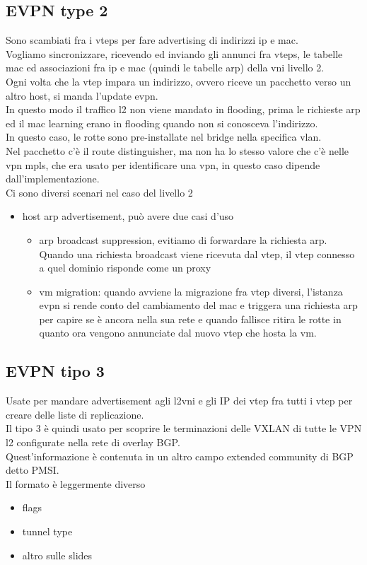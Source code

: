 \documentclass[12pt, oneside]{extbook} %
\begin{document}
\subsection{EVPN type 2}
Sono scambiati fra i vteps per fare advertising di indirizzi ip e mac.
\\Vogliamo sincronizzare, ricevendo ed inviando gli annunci fra vteps, le tabelle mac ed associazioni fra ip e mac (quindi le tabelle arp) della vni livello 2.
\\Ogni volta che la vtep impara un indirizzo, ovvero riceve un pacchetto verso un altro host, si manda l'update evpn.
\\In questo modo il traffico l2 non viene mandato in flooding, prima le richieste arp ed il mac learning erano in flooding quando non si conosceva l'indirizzo.
\\In questo caso, le rotte sono pre-installate nel bridge nella specifica vlan.
\\Nel pacchetto c'è il route distinguisher, ma non ha lo stesso valore che c'è nelle vpn mpls, che era usato per identificare una vpn, in questo caso dipende dall'implementazione.
\\Ci sono diversi scenari nel caso del livello 2
\begin{itemize}
    \item host arp advertisement, può avere due casi d'uso
    \begin{itemize}
        \item arp broadcast suppression, evitiamo di forwardare la richiesta arp.
        \\Quando una richiesta broadcast viene ricevuta dal vtep, il vtep connesso a quel dominio risponde come un proxy
        \item vm migration: quando avviene la migrazione fra vtep diversi, l'istanza evpn si rende conto del cambiamento del mac e triggera una richiesta arp per capire se è ancora nella sua rete e quando fallisce ritira le rotte in quanto ora vengono annunciate dal nuovo vtep che hosta la vm.
    \end{itemize}
\end{itemize}

\subsection{EVPN tipo 3}
Usate per mandare advertisement agli l2vni e gli IP dei vtep fra tutti i vtep per creare delle liste di replicazione.
\\Il tipo 3 è quindi usato per scoprire le terminazioni delle VXLAN di tutte le VPN l2 configurate nella rete di overlay BGP.
\\Quest'informazione è contenuta in un altro campo extended community di BGP detto PMSI.
\\Il formato è leggermente diverso
\begin{itemize}
\item flags
\item tunnel type
\item altro sulle slides
\end{itemize}
\end{document}
